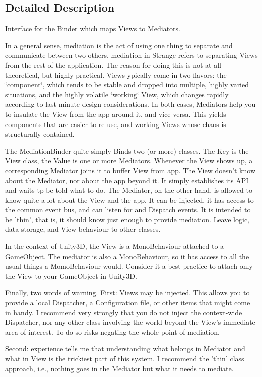 \subsection{Detailed Description}
Interface for the Binder which maps Views to Mediators. 

In a general sense, mediation is the act of using one thing to separate and communicate between two others. mediation in Strange refers to separating Views from the rest of the application. The reason for doing this is not at all theoretical, but highly practical. Views ypically come in two flavors\-: the \char`\"{}component\char`\"{}, which tends to be stable and dropped into multiple, highly varied situations, and the highly volatile \char`\"{}working\char`\"{} View, which changes rapidly according to last-\/minute design considerations. In both cases, Mediators help you to insulate the View from the app around it, and vice-\/versa. This yields components that are easier to re-\/use, and working Views whose chaos is structurally contained.

The Mediation\-Binder quite simply Binds two (or more) classes. The Key is the View class, the Value is one or more Mediators. Whenever the View shows up, a corresponding Mediator joins it to buffer View from app. The View doesn't know about the Mediator, nor about the app beyond it. It simply establishes its A\-P\-I and waits tp be told what to do. The Mediator, on the other hand, is allowed to know quite a lot about the View and the app. It can be injected, it has access to the common event bus, and can listen for and Dispatch events. It is intended to be 'thin', that is, it should know just enough to provide mediation. Leave logic, data storage, and View behaviour to other classes.

In the context of Unity3\-D, the View is a Mono\-Behaviour attached to a Game\-Object. The mediator is also a Mono\-Behaviour, so it has access to all the usual things a Momo\-Behaviour would. Consider it a best practice to attach only the View to your Game\-Object in Unity3\-D.

Finally, two words of warning. First\-: Views may be injected. This allows you to provide a local Dispatcher, a Configuration file, or other items that might come in handy. I recommend very strongly that you do not inject the context-\/wide Dispatcher, nor any other class involving the world beyond the View's immediate area of interest. To do so risks negating the whole point of mediation.

Second\-: experience tells me that understanding what belongs in Mediator and what in View is the trickiest part of this system. I recommend the 'thin' class approach, i.\-e., nothing goes in the Mediator but what it needs to mediate. 

